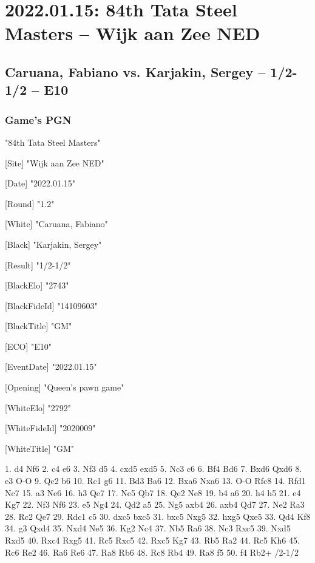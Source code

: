 \documentclass[9pt]{extarticle}
\begin{document}
\section*{2022.01.15: 84th Tata Steel Masters -- Wijk aan Zee NED}

\subsection*{Caruana, Fabiano vs. Karjakin, Sergey -- 1/2-1/2 -- E10}
\subsubsection*{Game's PGN}
\begin{flushleft}
[Event] "84th Tata Steel Masters"

[Site] "Wijk aan Zee NED"

[Date] "2022.01.15"

[Round] "1.2"

[White] "Caruana, Fabiano"

[Black] "Karjakin, Sergey"

[Result] "1/2-1/2"

[BlackElo] "2743"

[BlackFideId] "14109603"

[BlackTitle] "GM"

[ECO] "E10"

[EventDate] "2022.01.15"

[Opening] "Queen's pawn game"

[WhiteElo] "2792"

[WhiteFideId] "2020009"

[WhiteTitle] "GM"

\end{flushleft}
\begin{flushleft}
1. d4 Nf6 2. c4 e6 3. Nf3 d5 4. cxd5 exd5 5. Nc3 c6 6. Bf4 Bd6 7. Bxd6 Qxd6 8. e3 O-O 9. Qc2 b6 10. Rc1 g6 11. Bd3 Ba6 12. Bxa6 Nxa6 13. O-O Rfc8 14. Rfd1 Nc7 15. a3 Ne6 16. h3 Qe7 17. Ne5 Qb7 18. Qe2 Ne8 19. b4 a6 20. h4 h5 21. e4 Kg7 22. Nf3 Nf6 23. e5 Ng4 24. Qd2 a5 25. Ng5 axb4 26. axb4 Qd7 27. Ne2 Ra3 28. Rc2 Qe7 29. Rdc1 c5 30. dxc5 bxc5 31. bxc5 Nxg5 32. hxg5 Qxe5 33. Qd4 Kf8 34. g3 Qxd4 35. Nxd4 Ne5 36. Kg2 Nc4 37. Nb5 Ra6 38. Nc3 Rxc5 39. Nxd5 Rxd5 40. Rxc4 Rxg5 41. Rc5 Rxc5 42. Rxc5 Kg7 43. Rb5 Ra2 44. Rc5 Kh6 45. Rc6 Re2 46. Ra6 Re6 47. Ra8 Rb6 48. Rc8 Rb4 49. Ra8 f5 50. f4 Rb2+ \quad  {}/2-1/2
\end{flushleft}
\parindent 0mm
\end{document}
